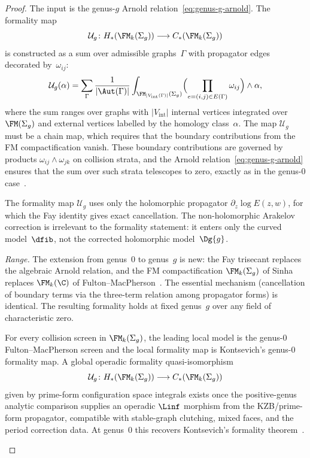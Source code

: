 \begin{proof}
The input is the genus-$g$ Arnold relation~\eqref{eq:genus-g-arnold}.
The formality map
\[
 \mathcal{U}_g \colon H_\ast(\FM_k(\Sigma_g))
 \longrightarrow C_\ast(\FM_k(\Sigma_g))
\]
is constructed as a sum over admissible graphs~$\Gamma$
with propagator edges decorated by~$\omega_{ij}$:
\[
 \mathcal{U}_g(\alpha)
 = \sum_{\Gamma} \frac{1}{|\Aut(\Gamma)|}
 \int_{\FM_{|V_{\mathrm{int}}(\Gamma)|}(\Sigma_g)}
 \Bigl(\prod_{e = (i,j) \in E(\Gamma)} \omega_{ij}\Bigr)
 \wedge \alpha,
\]
where the sum ranges over graphs with $|V_{\mathrm{int}}|$ internal
vertices integrated over $\FM(\Sigma_g)$ and external vertices
labelled by the homology class~$\alpha$.
The map $\mathcal{U}_g$ must be a chain map,
which requires that the boundary contributions from the FM
compactification vanish. These boundary contributions are
governed by products $\omega_{ij} \wedge \omega_{jk}$
on collision strata, and the Arnold
relation~\eqref{eq:genus-g-arnold} ensures that the sum over
such strata telescopes to zero, exactly as in the genus-$0$
case~\cite{Kon03}.

The formality map $\mathcal{U}_g$ uses only the holomorphic
propagator $\partial_z \log E(z,w)$, for which the Fay identity
gives exact cancellation. The non-holomorphic Arakelov correction
is irrelevant to the formality statement: it enters only the curved
model~$\dfib$, not the corrected holomorphic model~$\Dg{g}$.

\emph{Range.} The extension from genus~$0$ to genus~$g$
is new: the Fay trisecant replaces the algebraic Arnold relation,
and the FM compactification $\FM_k(\Sigma_g)$ of
Sinha~\cite{Sinha2004} replaces $\FM_k(\C)$ of
Fulton--MacPherson~\cite{FM94}. The essential
mechanism (cancellation of boundary terms via the three-term
relation among propagator forms) is identical.
The resulting formality holds at fixed genus~$g$
over any field of characteristic zero.

\providecommand{\FMg}[1]{\FM_{#1}(\Sigma_g)}
\providecommand{\omhol}{\omega^{(g)}}
\providecommand{\cU}{\mathcal{U}}
\providecommand{\cS}{\mathcal{S}}
\providecommand{\vol}{\mathrm{vol}}
\providecommand{\PP}{\mathbb{P}}

\begin{theorem}
\label{thm:genus-g-formality}
For every collision screen in $\FMg{k}$, the leading local model is
the genus-$0$ Fulton--MacPherson screen and the local formality
map is Kontsevich's genus-$0$ formality map. A global operadic
formality quasi-isomorphism
\[
 \cU_g \colon H_\ast(\FMg{k})
 \longrightarrow C_\ast(\FMg{k})
\]
given by prime-form configuration space integrals exists once the
positive-genus analytic comparison supplies an operadic $\Linf$
morphism from the KZB/prime-form propagator, compatible with
stable-graph clutching, mixed faces, and the period correction data.
At genus~$0$ this recovers Kontsevich's
formality theorem~\cite{Kon03}.
\end{theorem}


\end{proof}
